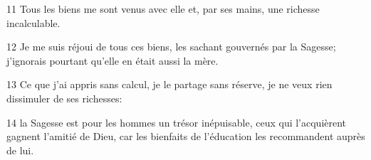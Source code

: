 
11 Tous les biens me sont venus avec elle et, par ses mains, une richesse incalculable.

12 Je me suis réjoui de tous ces biens, les sachant gouvernés par la Sagesse; j’ignorais pourtant qu’elle en était aussi la mère.

13 Ce que j’ai appris sans calcul, je le partage sans réserve, je ne veux rien dissimuler de ses richesses:

14 la Sagesse est pour les hommes un trésor inépuisable, ceux qui l’acquièrent gagnent l’amitié de Dieu, car les bienfaits de l’éducation les recommandent auprès de lui.